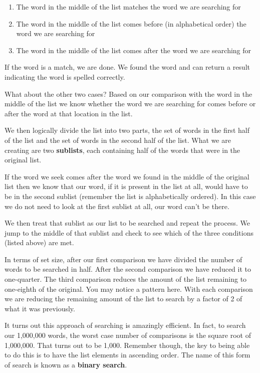 \begin{enumerate}
	\item The word in the middle of the list matches the word we are searching for
	\item The word in the middle of the list comes before (in alphabetical order) the word we are searching for
	\item The word in the middle of the list comes after the word we are searching for
\end{enumerate}

If the word is a match, we are done. We found the word and can return a result indicating the word is spelled correctly.

What about the other two cases? Based on our comparison with the word in the middle of the list we know whether the word we are searching for comes before or after the word at that location in the list.

We then logically divide the list into two parts, the set of words in the first half of the list and the set of words in the second half of the list. What we are creating are two \textbf{sublists}, each containing half of the words that were in the original list. 

If the word we seek comes after the word we found in the middle of the original list then we know that our word, if it is present in the list at all, would have to be in the second sublist (remember the list is alphabetically ordered). In this case we do not need to look at the first sublist at all, our word can't be there.

We then treat that sublist as our list to be searched and repeat the process. We jump to the middle of that sublist and check to see which of the three conditions (listed above) are met.

In terms of set size, after our first comparison we have divided the number of words to be searched in half. After the second comparison we have reduced it to one-quarter. The third comparison reduces the amount of the list remaining to one-eighth of the original. You may notice a pattern here. With each comparison we are reducing the remaining amount of the list to search by a factor of 2 of what it was previously.

It turns out this approach of searching is amazingly efficient. In fact, to search our 1,000,000 words, the worst case number of comparisons is the square root of 1,000,000. That turns out to be 1,000. Remember though, the key to being able to do this is to have the list elements in ascending order. The name of this form of search is known as a \textbf{binary search}.

